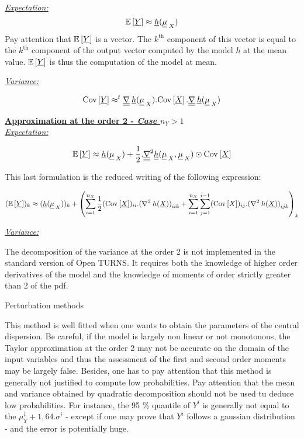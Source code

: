 {  \underline{\textit{Expectation:}}
  $$
  {\mathbb E}\left[ \underline{Y} \right] \approx \underline{h}(\underline{\mu}_{\:X})
  $$
  Pay attention that ${\mathbb E}\left[ \underline{Y} \right]$ is a vector. The $k^\textrm{th}$ component of this vector is equal to the $k^\textrm{th}$ component of the output vector computed by the model $h$ at the mean value. ${\mathbb E}\left[ \underline{Y} \right]$ is thus the computation of the model at mean.

  \underline{\textit{Variance:}}

  $$
  {\rm Cov}\left[ \underline{Y} \right] \approx ^t\underline{\underline{\nabla}}\:\underline{h}(\underline{\mu}_{\:X}).{\rm Cov}\left[ \underline{X} \right].\underline{\underline{\nabla}}\:\underline{h}(\underline{\mu}_{\:X})
  $$

  \underline{\textbf{Approximation at the order 2 - \textit{Case $n_Y > 1$}}}\\

  \underline{\textit{Expectation:}}

  $$
  {\mathbb E}\left[ \underline{Y} \right] \approx \underline{h}(\underline{\mu}_{\:X}) + \frac{1}{2}.\underline{\underline{\underline{\nabla}}}^2 \underline{\underline{h}}(\underline{\mu}_{\:X},\underline{\mu}_{\:X}) \odot {\rm Cov}\left[ \underline{X} \right]
  $$

  This last formulation is the reduced writing of the following expression:

  $$
  ({\mathbb E}\left[ \underline{Y} \right])_k \approx (\underline{h}(\underline{\mu}_{\:X}))_k + \left( \sum_{i=1}^{n_X}\frac{1}{2} ({\rm Cov}\left[ \underline{X} \right])_{ii}.{(\nabla^2\:h(\underline{X}))}_{iik} + \sum_{i=1}^{n_X} \sum_{j=1}^{i-1} ({\rm Cov}\left[ X \right])_{ij}.{(\nabla^2\:h(\underline{X}))}_{ijk}  \right)_k
  $$

  \underline{\textit{Variance:}}

  The decomposition of the variance at the order 2 is not implemented in the standard version of Open TURNS. It requires both the knowledge of higher order derivatives of the model and the knowledge of moments of order strictly greater than 2 of the pdf.

}
{
  Perturbation methods
}


{
  This method is well fitted when one wants to obtain the parameters of the central dispersion. Be careful, if the model is largely non linear or not monotonous, the Taylor approximation at the order 2 may not be accurate on the domain of the input variables and thus the assessment of the first and second order moments may be largely false. Besides, one has to pay attention that this method is generally not justified to compute low probabilities.
  Pay attention that the mean and variance obtained by quadratic decomposition should not be used tu deduce low probabilities. For instance, the 95 \% quantile of $Y^i$ is generally not equal to the $\mu_Y^i + 1,64 . \sigma^i$ - except if one may prove that $Y^i$ follows a gaussian distribution - and the error is potentially huge.
}
